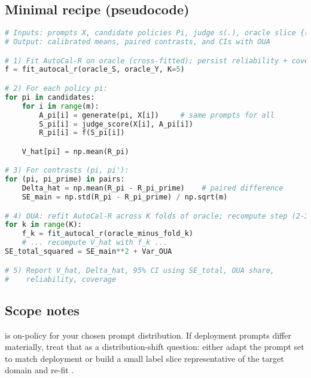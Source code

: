 \subsection{Minimal recipe (pseudocode)}

\begin{lstlisting}[language=Python,caption=DM Recipe]
# Inputs: prompts X, candidate policies Pi, judge s(.), oracle slice {(S, Y)}
# Output: calibrated means, paired contrasts, and CIs with OUA

# 1) Fit AutoCal-R on oracle (cross-fitted); persist reliability + coverage edges
f = fit_autocal_r(oracle_S, oracle_Y, K=5)

# 2) For each policy pi:
for pi in candidates:
    for i in range(m):
        A_pi[i] = generate(pi, X[i])     # same prompts for all
        S_pi[i] = judge_score(X[i], A_pi[i])
        R_pi[i] = f(S_pi[i])

    V_hat[pi] = np.mean(R_pi)

# 3) For contrasts (pi, pi'):
for (pi, pi_prime) in pairs:
    Delta_hat = np.mean(R_pi - R_pi_prime)    # paired difference
    SE_main = np.std(R_pi - R_pi_prime) / np.sqrt(m)

# 4) OUA: refit AutoCal-R across K folds of oracle; recompute step (2-3)
for k in range(K):
    f_k = fit_autocal_r(oracle_minus_fold_k)
    # ... recompute V_hat with f_k ...
SE_total_squared = SE_main**2 + Var_OUA

# 5) Report V_hat, Delta_hat, 95% CI using SE_total, OUA share,
#    reliability, coverage
\end{lstlisting}

\subsection{Scope notes}

\dm{} is on-policy for your chosen prompt distribution. If deployment prompts differ materially, treat that as a distribution-shift question: either adapt the prompt set to match deployment or build a small label slice representative of the target domain and re-fit \autocal.
